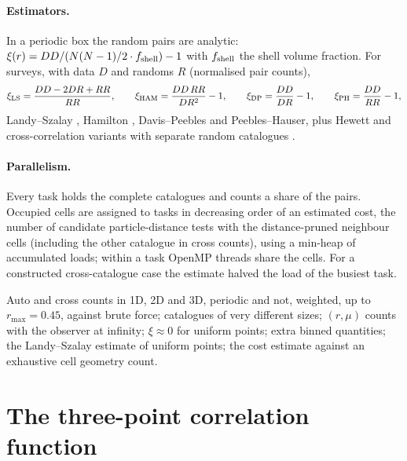 \paragraph*{Estimators.} In a periodic box the random pairs are analytic: $\xi(r)=DD/(N(N-1)/2\cdot f_{\rm shell})-1$ with $f_{\rm shell}$ the shell
volume fraction. For surveys, with data $D$ and randoms $R$ (normalised pair counts),
\begin{gather}
\xi_{\rm LS}=\frac{DD-2DR+RR}{RR},\qquad\xi_{\rm HAM}=\frac{DD\,RR}{DR^2}-1,\qquad\xi_{\rm DP}=\frac{DD}{DR}-1,\qquad\xi_{\rm PH}=\frac{DD}{RR}-1,
\end{gather}
Landy--Szalay \cite{LandySzalay1993}, Hamilton \cite{Hamilton1993}, Davis--Peebles \cite{DavisPeebles1983} and Peebles--Hauser, plus Hewett and
cross-correlation variants with separate random catalogues \cite{Kerscher2000}.

\paragraph*{Parallelism.} Every task holds the complete catalogues and counts a share of the pairs. Occupied cells are assigned to tasks in decreasing
order of an estimated cost, the number of candidate particle-distance tests with the distance-pruned neighbour cells (including the other catalogue in
cross counts), using a min-heap of accumulated loads; within a task OpenMP threads share the cells. For a constructed cross-catalogue case the estimate
halved the load of the busiest task.

\begin{validation}
Auto and cross counts in 1D, 2D and 3D, periodic and not, weighted, up to $r_{\max}=0.45$, against brute force; catalogues of very different sizes; $(r,\mu)$
counts with the observer at infinity; $\xi\approx0$ for uniform points; extra binned quantities; the Landy--Szalay estimate of uniform points; the cost
estimate against an exhaustive cell geometry count.
\end{validation}

\section{The three-point correlation function}\label{sec:cs-3pcf}


